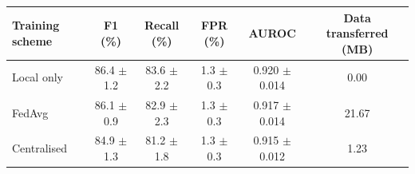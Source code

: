 \begin{tabular}{@{}lccccc@{}}
\toprule
Training scheme & F1 (\%) & Recall (\%) & FPR (\%) & AUROC & Data transferred (MB) \\
\midrule
Local only & 86.4 $\pm$ 1.2 & 83.6 $\pm$ 2.2 & 1.3 $\pm$ 0.3 & 0.920 $\pm$ 0.014 & 0.00 \\
FedAvg & 86.1 $\pm$ 0.9 & 82.9 $\pm$ 2.3 & 1.3 $\pm$ 0.3 & 0.917 $\pm$ 0.014 & 21.67 \\
Centralised & 84.9 $\pm$ 1.3 & 81.2 $\pm$ 1.8 & 1.3 $\pm$ 0.3 & 0.915 $\pm$ 0.012 & 1.23 \\
\bottomrule
\end{tabular}